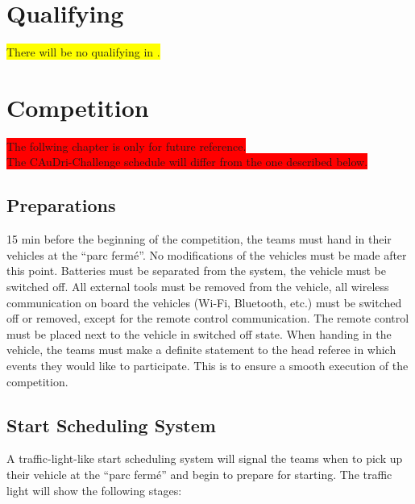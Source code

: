 \documentclass[a4paper]{report}
\begin{document}
\section{Qualifying}

\colorbox{yellow}{There will be no qualifying in \the\year{}.}

\section{Competition}

\colorbox{red}{The follwing chapter is only for future reference.}\\
\colorbox{red}{The \the\year{} CAuDri-Challenge schedule will differ from the one described below.}

\subsection{Preparations}

15 min before the beginning of the competition, the teams must hand in their vehicles at the “parc fermé”. No modifications of the vehicles must be made after this point. Batteries must be separated from the system, the vehicle must be switched off. All external tools must be removed from the vehicle, all wireless communication on board the vehicles (Wi-Fi, Bluetooth, etc.) must be switched off or removed, except for the remote control communication. The remote control must be placed next to the vehicle in switched off state. When handing in the vehicle, the teams must make a definite statement to the head referee in which events they would like to participate. This is to ensure a smooth execution of the competition.

\subsection{Start Scheduling System}
\label{start_scheduling}

A traffic-light-like start scheduling system will signal the teams when to pick
up their vehicle at the “parc fermé” and begin to prepare for starting. The
traffic light will show the following stages:
\end{document}
